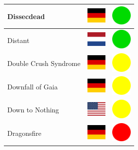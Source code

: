 \documentclass[12pt, a4paper, twoside]{report}
\begin{document}
\begin{center}
\begin{longtable}{|p{5cm}|p{2cm}|p{2cm}|}
 Dissecdead                                                 & \includegraphics[width=1cm]{../4x3/de} &   \includegraphics[width=1cm]{../likes/y} \\ \hline
 Distant                                                    & \includegraphics[width=1cm]{../4x3/nl} &   \includegraphics[width=1cm]{../likes/y} \\ \hline
 Double Crush Syndrome                                      & \includegraphics[width=1cm]{../4x3/de} &   \includegraphics[width=1cm]{../likes/m} \\ \hline
 Downfall of Gaia                                           & \includegraphics[width=1cm]{../4x3/de} &   \includegraphics[width=1cm]{../likes/m} \\ \hline
 Down to Nothing                                            & \includegraphics[width=1cm]{../4x3/us} &   \includegraphics[width=1cm]{../likes/m} \\ \hline
 Dragonsfire                                                & \includegraphics[width=1cm]{../4x3/de} &   \includegraphics[width=1cm]{../likes/n} \\ \hline

\end{longtable}
\end{center}
\end{document}
